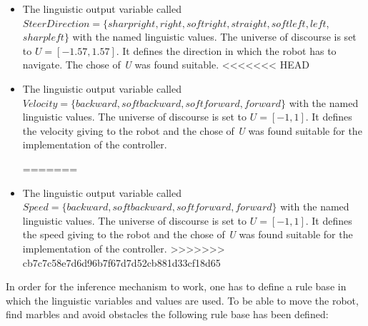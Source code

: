 \documentclass[../Head/Main.tex]{subfiles}
\begin{document}
\begin{itemize}
\item The linguistic output variable called $SteerDirection = \{sharpright, right, softright, straight, softleft, left$, $sharpleft\}$ with the named linguistic values. The universe of discourse is set to ${U} = [-1.57, 1.57]$. It defines the direction in which the robot has to navigate. The chose of \textit{U} was found suitable.
<<<<<<< HEAD
\item The linguistic output variable called $Velocity = \{backward, softbackward, softforward, forward\}$ with the named linguistic values. The universe of discourse is set to ${U} = [-1, 1]$. It defines the velocity giving to the robot and the chose of \textit{U} was found suitable for the implementation of the controller.      
      
=======
\item The linguistic output variable called $Speed = \{backward, softbackward, softforward, forward\}$ with the named linguistic values. The universe of discourse is set to ${U} = [-1, 1]$. It defines the speed giving to the robot and the chose of \textit{U} was found suitable for the implementation of the controller.      
>>>>>>> cb7c7c58e7d6d96b7f67d7d52cb881d33cf18d65
\end{itemize}
In order for the inference mechanism to work, one has to define a rule base in which the linguistic variables and values are used. To be able to move the robot, find marbles and avoid obstacles the following rule base has been defined:  
\end{document}
